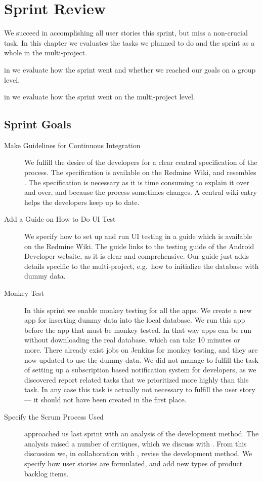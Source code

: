 \chapter{Sprint Review}\label{chap:sprint3_end}
We succeed in accomplishing all user stories this sprint, but miss a non-crucial task. In this chapter we evaluates the tasks we planned to do and the sprint as a whole in the multi-project.

\begin{chapterorganization}
  \item in  we evaluate how the sprint went and whether we reached our goals on a group level.
  \item in  we evaluate how the sprint went on the multi-project level.
\end{chapterorganization}

\section{Sprint Goals}\label{sec:s3_goals}
\begin{description}
  \item[Make Guidelines for Continuous Integration] We fulfill the desire of the developers for a clear central specification of the process. The specification is available on the Redmine Wiki, and resembles . The specification is necessary as it is time consuming to explain it over and over, and because the process sometimes changes. A central wiki entry helps the developers keep up to date.
  \item[Add a Guide on How to Do UI Test] We specify how to set up and run UI testing in a guide which is available on the Redmine Wiki. The guide links to the testing guide \parencite{AndroidUnit} of the Android Developer website, as it is clear and comprehensive. Our guide just adds details specific to the multi-project, e.g.\ how to initialize the database with dummy data.
  \item[Monkey Test] In this sprint we enable monkey testing for all the apps. We create a new app for inserting dummy data into the local database. We run this app before the app that must be monkey tested. In that way apps can be run without downloading the real database, which can take 10 minutes or more. There already exist jobs on Jenkins for monkey testing, and they are now updated to use the dummy data. We did not manage to fulfill the task of setting up a subscription based notification system for developers, as we discovered report related tasks that we prioritized more highly than this task. In any case this task is actually not necessary to fulfill the user story --- it should not have been created in the first place.
  \item[Specify the Scrum Process Used]  approached us last sprint with an analysis of the development method. The analysis raised a number of critiques, which we discuss with . From this discussion we, in collaboration with , revise the development method. We specify how user stories are formulated, and add new types of product backlog items.
\end{description}

